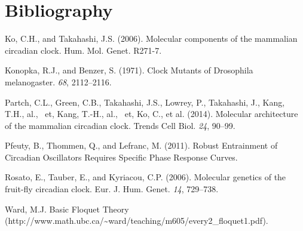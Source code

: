 \documentclass[10pt,letter, swedish, english,%
]{article}
\begin{document}
\section*{Bibliography}
Ko, C.H., and Takahashi, J.S. (2006). Molecular components of the
mammalian circadian clock. Hum. Mol. Genet. R271-7.

\bigskip\noindent
Konopka, R.J., and Benzer, S. (1971). Clock Mutants of Drosophila
melanogaster. \textit{68}, 2112–2116.

\bigskip\noindent{}
Partch, C.L., Green, C.B., Takahashi, J.S., Lowrey, P., Takahashi, J.,
Kang, T.H., al., \ et, Kang, T.-H., al., \ et, Ko, C., et al. (2014).
Molecular architecture of the mammalian circadian clock. Trends Cell
Biol. \textit{24}, 90–99.

\bigskip\noindent
Pfeuty, B., Thommen, Q., and Lefranc, M. (2011). Robust Entrainment of
Circadian Oscillators Requires Specific Phase Response Curves.

\bigskip\noindent
Rosato, E., Tauber, E., and Kyriacou, C.P. (2006). Molecular genetics
of the fruit-fly circadian clock. Eur. J. Hum. Genet. \textit{14},
729–738.

\bigskip\noindent
Ward, M.J. Basic Floquet Theory
(http://www.math.ubc.ca/\~{}ward/teaching/m605/every2\_floquet1.pdf).
\end{document}
